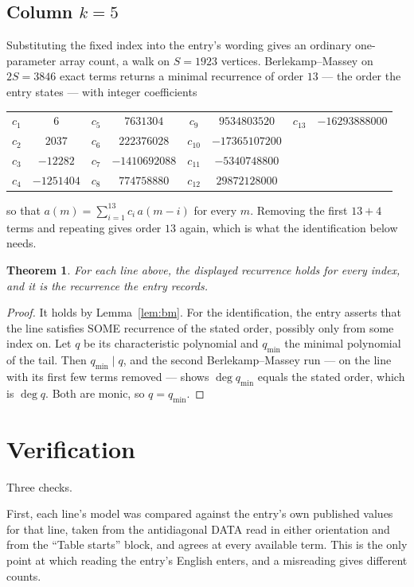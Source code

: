 \documentclass[11pt,a4paper]{article}
\theoremstyle{plain}
\newtheorem{theorem}{Theorem}
\theoremstyle{definition}
\begin{document}
\subsection*{Column $k=5$}
Substituting the fixed index into the entry's wording gives an ordinary one-parameter array
count, a walk on $S=1923$ vertices. Berlekamp--Massey on $2S=3846$ exact terms
returns a minimal recurrence of order $13$ --- the order the entry states --- with
integer coefficients
\begin{center}\small\begin{tabular}{cccccccc}
$c_{1}$ & $6$ & $c_{5}$ & $7631304$ & $c_{9}$ & $9534803520$ & $c_{13}$ & $-16293888000$ \\
$c_{2}$ & $2037$ & $c_{6}$ & $222376028$ & $c_{10}$ & $-17365107200$ &  &  \\
$c_{3}$ & $-12282$ & $c_{7}$ & $-1410692088$ & $c_{11}$ & $-5340748800$ &  &  \\
$c_{4}$ & $-1251404$ & $c_{8}$ & $774758880$ & $c_{12}$ & $29872128000$ &  &  \\
\end{tabular}\end{center}
so that $a(m)=\sum_{i=1}^{13}c_i\,a(m-i)$ for every $m$. Removing the first
$13+4$ terms and repeating gives order $13$ again, which is what the
identification below needs.

\begin{theorem}
For each line above, the displayed recurrence holds for every index, and it is the recurrence
the entry records.
\end{theorem}

\begin{proof}
It holds by Lemma~\ref{lem:bm}. For the identification, the entry asserts that the line
satisfies SOME recurrence of the stated order, possibly only from some index on. Let $q$ be its
characteristic polynomial and $q_{\min}$ the minimal polynomial of the tail. Then
$q_{\min}\mid q$, and the second Berlekamp--Massey run --- on the line with its first few
terms removed --- shows $\deg q_{\min}$ equals the stated order, which is $\deg q$. Both are
monic, so $q=q_{\min}$.
\end{proof}

\section{Verification}

Three checks.

First, each line's model was compared against the entry's own published values for that line,
taken from the antidiagonal DATA read in either orientation and from the ``Table starts''
block, and agrees at every available term. This is the only point at which reading the entry's
English enters, and a misreading gives different counts.
\end{document}
